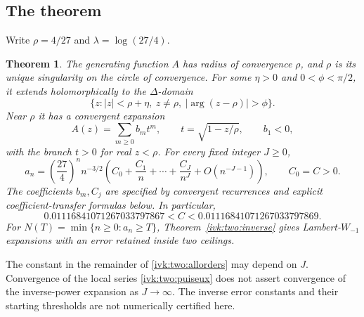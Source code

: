 \documentclass[11pt,letterpaper]{article}
\newtheorem{theorem}{Theorem}[section]
\theoremstyle{remark}\newtheorem{remark}[theorem]{Remark}
\begin{document}
\subsection{The theorem}
Write $\rho=4/27$ and $\lambda=\log(27/4)$.
\begin{theorem}\label{ivk:two:main}
The generating function $A$ has radius of convergence $\rho$, and $\rho$
is its unique singularity on the circle of convergence. For some
$\eta>0$ and $0<\phi<\pi/2$, it extends holomorphically to the
$\Delta$-domain
\begin{equation}\label{ivk:two:delta}
 \{z:|z|<\rho+\eta,\ z\ne\rho,\ |\arg(z-\rho)|>\phi\}.
\end{equation}
Near $\rho$ it has a convergent expansion
\begin{equation}\label{ivk:two:puiseux}
 A(z)=\sum_{m\ge0}b_m t^m,\qquad t=\sqrt{1-z/\rho},
 \qquad b_1<0,
\end{equation}
with the branch $t>0$ for real $z<\rho$. For every fixed integer $J\ge0$,
\begin{equation}\label{ivk:two:allorders}
 a_n=\left(\frac{27}{4}\right)^n n^{-3/2}
 \left(C_0+\frac{C_1}{n}+\cdots+\frac{C_J}{n^J}
       +O(n^{-J-1})\right),
 \qquad C_0=C>0.
\end{equation}
The coefficients $b_m,C_j$ are specified by convergent recurrences and
explicit coefficient-transfer formulas below. In particular,
\begin{equation}\label{ivk:two:Cinterval}
 0.01116841071267033797867<C<0.01116841071267033797869.
\end{equation}
For $N(T)=\min\{n\ge0:a_n\ge T\}$, Theorem~\ref{ivk:two:inverse} gives
Lambert-$W_{-1}$ expansions with an error retained inside two ceilings.
\end{theorem}
The constant in the remainder of \eqref{ivk:two:allorders} may depend on $J$.
Convergence of the local series \eqref{ivk:two:puiseux} does not assert
convergence of the inverse-power expansion as $J\to\infty$. The
inverse error constants and their starting thresholds are not
numerically certified here.
\end{document}
